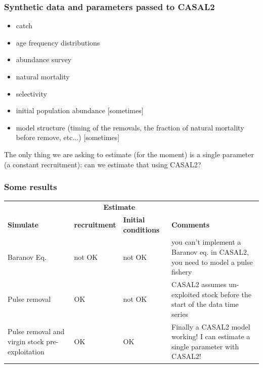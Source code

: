 \documentclass{beamer}
\begin{document}

\begin{frame}
\frametitle{Synthetic data and parameters passed to CASAL2}

\begin{itemize}
\item catch
\item age frequency distributions
\item abundance survey
\item natural mortality
\item selectivity
\item initial population abundance [sometimes]
\item model structure (timing of the removals, the fraction of natural mortality before remove, etc...) [sometimes]
\end{itemize}

The only thing we are asking to estimate (for the moment) is a single parameter (a constant recruitment): can we estimate that using CASAL2?

\end{frame}




\begin{frame}
\frametitle{Some results}

\begin{table}
  \tiny
\begin{tabular}{|m{4cm}|m{1cm}|m{1cm}|m{4cm}|}
\hline
                & \multicolumn{2}{|c|}{\bf Estimate}                       &          \\ 
  {\bf Simulate}      & {\bf recruitment}          & {\bf Initial conditions} & {\bf Comments} \\ \hline
  Baranov Eq.   & not OK               & not OK                      & you can't implement a Baranov eq. in CASAL2, you need to model a pulse fishery \\ \hline
  Pulse removal & OK                   & not OK                      & CASAL2 assumes un-exploited stock before the start of the data time series \\ \hline
  Pulse removal and virgin stock pre-exploitation & OK & OK          & Finally a CASAL2 model working! I can estimate a single parameter with CASAL2!\\ \hline
\end{tabular}
\end{table}
\end{frame}
\end{document}
